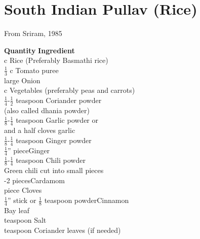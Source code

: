\section{South Indian Pullav (Rice)}
  From Sriram, 1985

\begin{tabbing}
\hspace{1.0cm}  \={\bf Quantity}   \hspace{3.0cm} \={\bf Ingredient}\\
 c   \>Rice (Preferably Basmathi rice)\\
 \>$\frac{1}{3}$ c   \>Tomato puree\\
  large   \>Onion\\
  c   \>Vegetables (preferably peas and carrots)\\
 \>$\frac{1}{4}$-$\frac{1}{2}$ teaspoon   \>Coriander powder\\
\> \>(also called dhania powder) \\
\>$\frac{1}{8}$-$\frac{1}{4}$ teaspoon    \>Garlic powder or \\
 and a half cloves garlic \\
\>$\frac{1}{8}$-$\frac{1}{4}$ teaspoon \>Ginger powder\\
\>$\frac{1}{4}$'' piece\>Ginger \\
\>$\frac{1}{8}$-$\frac{1}{4}$ teaspoon \>Chili  powder\\
 \>Green chili cut into small pieces\\
 -2 pieces\>Cardamom\\
  piece   \>Cloves\\
 \>$\frac{1}{4}$'' stick or $\frac{1}{8}$ teaspoon powder\>Cinnamon\\
    \>Bay leaf\\
  teaspoon   \>Salt\\
  teaspoon   \>Coriander leaves (if needed)\\
\end{tabbing}

